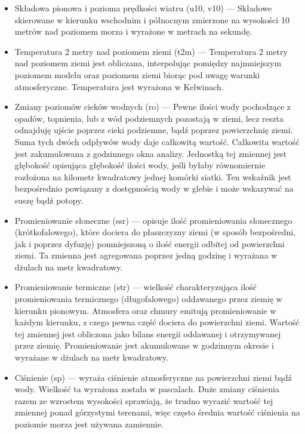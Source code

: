 \begin{itemize}
    \item Składowa pionowa i pozioma prędkości wiatru (u10, v10) — 
    Składowe skierowane w kierunku wschodnim i północnym zmierzone na wysokości 10 metrów nad poziomem
    morza i wyrażone w metrach na sekundę.

    \item Temperatura 2 metry nad poziomem ziemi (t2m) — Temperatura 2 metry nad poziomem ziemi jest
    obliczana, interpolując pomiędzy najmniejszym poziomem modelu oraz poziomem ziemi biorąc pod
    uwagę warunki atmosferyczne. Temperatura jest wyrażona w Kelwinach.

    \item Zmiany poziomów cieków wodnych (ro) — 
    Pewne ilości wody pochodzące z opadów, topnienia, lub z wód podziemnych pozostają w ziemi, lecz reszta
    odnajduję ujście poprzez cieki podziemne, bądź poprzez powierzchnię ziemi. Suma tych dwóch
    odpływów wody daje całkowitą wartość. Całkowita wartość jest zakumulowana z godzinnego
    okna analizy. Jednostką tej zmiennej jest głębokość opisująca głębokość ilości wody, jeśli byłaby
    równomiernie rozłożona na kilometr kwadratowy jednej komórki siatki. Ten wskaźnik jest
    bezpośrednio powiązany z dostępnością wody w glebie i może wskazywać na suszę bądź potopy.

    \item Promieniowanie słoneczne (ssr) — opisuje ilość promieniowania słonecznego (krótkofalowego), które dociera do 
    płaszczyzny ziemi (w sposób bezpośredni, jak i poprzez dyfuzję) pomniejszoną o ilość energii
    odbitej od powierzchni ziemi. Ta zmienna jest agregowana poprzez jedną godzinę i wyrażana w 
    dżulach na metr kwadratowy.

    \item Promieniowanie termiczne (str) — wielkość charakteryzująca ilość promieniowania termicznego
    (długofalowego) oddawanego przez ziemię w kierunku pionowym. Atmosfera oraz chmury emitują 
    promieniowanie w każdym kierunku, z czego pewna część dociera do powierzchni ziemi. Wartość
    tej zmiennej jest obliczona jako bilans energii oddawanej i otrzymywanej przez ziemię. 
    Promieniowanie jest akumulowane w godzinnym okresie i wyrażane w dżulach na metr kwadratowy.

    \item Ciśnienie (sp) — wyraża ciśnienie atmosferyczne na powierzchni ziemi bądź wody. Wielkość
    ta wyrażona została w pascalach. Duże zmiany ciśnienia razem ze wzrostem wysokości sprawiają,
    że trudno wyrazić wartość tej zmiennej ponad górzystymi terenami, więc często średnia wartość
    ciśnienia na poziomie morza jest używana zamiennie.


\end{itemize}
